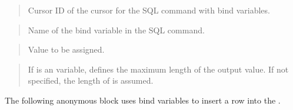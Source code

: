 \documentclass[letterpaper,10pt,english,openany,oneside]{sphinxmanual}
\begin{document}

\begin{quote}

Cursor ID of the cursor for the SQL command with bind variables.
\end{quote}

\begin{quote}

Name of the bind variable in the SQL command.
\end{quote}

\begin{quote}

Value to be assigned.
\end{quote}

\begin{quote}

If  is an  variable, defines the maximum length of the
output value. If not specified, the length of  is assumed.
\end{quote}


The following anonymous block uses bind variables to insert a row into
the .
\end{document}
